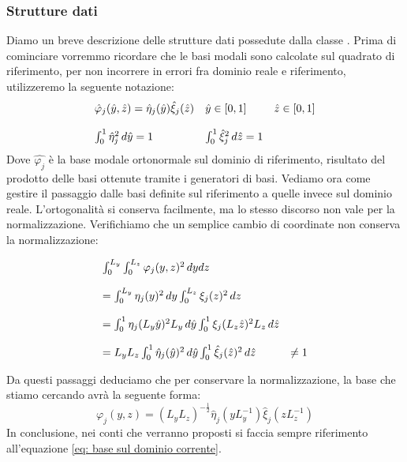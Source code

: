 \subsubsection{Strutture dati}
Diamo un breve descrizione delle strutture dati possedute dalla classe . Prima di cominciare vorremmo 
ricordare che le basi modali sono calcolate sul quadrato di riferimento, per non incorrere in errori fra dominio reale e riferimento,  
utilizzeremo la seguente notazione:
\begin{equation}
\label{eq: notazione}
\begin{array}{l l l}
\hat{\varphi}_j(\hat{y},\hat{z}) = \hat{\eta}_j(\hat{y}) \hat{\xi}_j(\hat{z}) & \hat{y} \in [0,1] & \hat{z} \in [0,1] 
\\
\\
\int_0^1 \hat{\eta}^2_j\,d\hat{y} = 1 & \int_0^1 \hat{\xi}^2_j\,d\hat{z} = 1
\end{array}
\end{equation}
Dove $\hat{\varphi_j}$ \`e la base modale ortonormale sul dominio di riferimento, risultato del prodotto delle basi ottenute tramite i 
generatori di basi.
Vediamo ora come gestire il passaggio dalle basi definite sul riferimento a quelle invece sul dominio reale. L'ortogonalit\`a si conserva 
facilmente, ma lo stesso discorso non vale per la normalizzazione. Verifichiamo che un semplice cambio di coordinate non conserva la 
normalizzazione:

\begin{equation}
\label{eq: trasformazione}
\begin{array}{l l }
\int_0^{L_y}\int_0^{L_z} \varphi_j(y,z)^2 \,dydz 
\\
\\
= \int_0^{L_y} \eta_j(y)^2 \,dy\int_0^{L_z} \xi_j(z)^2 \,dz 
\\
\\
= \int_0^{1} \eta_j(L_y\hat{y})^2 L_y\,d\hat{y} \int_0^{1} \xi_j(L_z\hat{z})^2 L_z\,d\hat{z} 
\\
\\
 = L_yL_z\int_0^{1} \hat{\eta}_j(\hat{y})^2 \,d\hat{y} \int_0^{1} \hat{\xi}_j(\hat{z})^2 \,d\hat{z} & \neq  1  
\end{array}
\end{equation}

Da questi passaggi deduciamo che per conservare la normalizzazione, la base che stiamo cercando avr\`a la seguente forma:
\begin{equation}
\label{eq: base sul dominio corrente}
\varphi_j(y,z) = (L_yL_z)^{-\frac{1}{2}}\hat{\eta}_j(yL_y^{-1})\hat{\xi}_j(zL_z^{-1})
\end{equation}
In conclusione, nei conti che verranno proposti si faccia sempre riferimento all'equazione \eqref{eq: base sul dominio corrente}.

